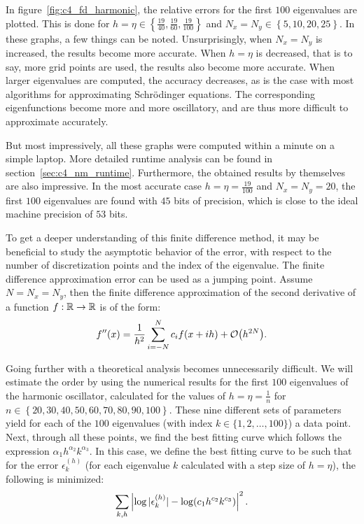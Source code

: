 In figure~\ref{fig:c4_fd_harmonic}, the relative errors for the first $100$ eigenvalues are plotted. This is done for $h = \eta \in \left\{\frac{19}{40}, \frac{19}{60}, \frac{19}{100}\right\}$ and $N_x = N_y \in \left\{ 5, 10, 20, 25 \right\}$. In these graphs, a few things can be noted. Unsurprisingly, when $N_x = N_y$ is increased, the results become more accurate. When $h = \eta$ is decreased, that is to say, more grid points are used, the results also become more accurate. When larger eigenvalues are computed, the accuracy decreases, as is the case with most algorithms for approximating Schrödinger equations. The corresponding eigenfunctions become more and more oscillatory, and are thus more difficult to approximate accurately.

But most impressively, all these graphs were computed within a minute on a simple laptop. More detailed runtime analysis can be found in section~\ref{sec:c4_nm_runtime}. Furthermore, the obtained results by themselves are also impressive. In the most accurate case $h= \eta = \frac{19}{100}$ and $N_x = N_y = 20$, the first $100$ eigenvalues are found with $45$ bits of precision, which is close to the ideal machine precision of $53$ bits.

To get a deeper understanding of this finite difference method, it may be beneficial to study the asymptotic behavior of the error, with respect to the number of discretization points and the index of the eigenvalue. The finite difference approximation error can be used as a jumping point. Assume $N = N_x = N_y$, then the finite difference approximation of the second derivative of a function $f : \mathbb{R} \to \mathbb{R}$ is of the form:
$$
    f''(x) = \frac{1}{h^2}\sum_{i=-N}^{N} c_{i} f(x + i h) + \OO\mleft(h^{2N}\mright)\text{.}
$$

Going further with a theoretical analysis becomes unnecessarily difficult. We will estimate the order by using the numerical results for the first $100$ eigenvalues of the harmonic oscillator, calculated for the values of $h = \eta = \frac{1}{n}$ for $n \in \left\{20, 30, 40, 50, 60, 70, 80, 90, 100\right\}$. These nine different sets of parameters yield for each of the $100$ eigenvalues (with index $k \in \{1, 2, \dots, 100\}$) a data point. Next, through all these points, we find the best fitting curve which follows the expression $\alpha_1 h^{\alpha_2} k^{\alpha_3}$. In this case, we define the best fitting curve to be such that for the error $\epsilon_k^{(h)}$ (for each eigenvalue $k$ calculated with a step size of $h = \eta$), the following is minimized:
$$
    \sum_{k, h}\left|\log|\epsilon_{k}^{(h)}| - \log\mleft(c_1 h^{c_2} k^{c_3}\mright)\right|^2 \text{.}
$$

